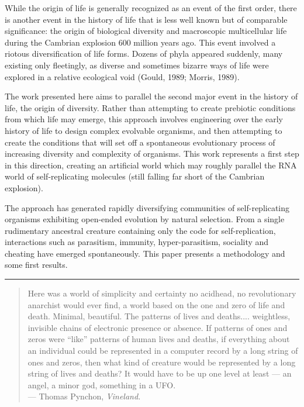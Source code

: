 While the origin of life is generally recognized as an event of the first
order, there is another event in the history of life that is less well known
but of comparable significance: the origin of biological diversity and
macroscopic multicellular life during the Cambrian explosion 600 million
years ago.  This event involved a riotous diversification of life forms.
Dozens of phyla appeared suddenly, many existing only fleetingly, as
diverse and sometimes bizarre ways of life were explored in a relative
ecological void (Gould, 1989; Morris, 1989).

The work presented here aims to parallel the second major event in the
history of life, the origin of diversity.  Rather than attempting to create
prebiotic conditions from which life may emerge, this approach involves
engineering over the early history of life to design complex evolvable
organisms, and then attempting to create the conditions that will set off
a spontaneous evolutionary process of increasing diversity and complexity
of organisms.  This work represents a first step in this direction, creating
an artificial world which may roughly parallel the RNA world of
self-replicating molecules (still falling far short of the Cambrian explosion).

The approach has generated rapidly diversifying communities of self-replicating
organisms exhibiting open-ended evolution by natural selection.  From a single
rudimentary ancestral creature containing only the code for self-replication,
interactions such as parasitism, immunity, hyper-parasitism, sociality and
cheating have emerged spontaneously.  This paper presents a methodology and
some first results.

\LP
\rule[6pt]{6.5in}{1pt}

\begin{quote}
Here was a world of simplicity and certainty no acidhead, no revolutionary
anarchist would ever find, a world based on the one and zero of life and
death.  Minimal, beautiful.  The patterns of lives and deaths....
weightless, invisible chains of electronic presence or absence.  If
patterns of ones and zeros were ``like'' patterns of human lives and
deaths, if everything about an individual could be represented in a
computer record by a long string of ones and zeros, then what kind of
creature would be represented by a long string of lives and deaths?
It would have to be up one level at least --- an angel, a minor god,
something in a UFO.\\
\hspace*{2in} --- Thomas Pynchon, \it Vineland\rm .
\end{quote}

